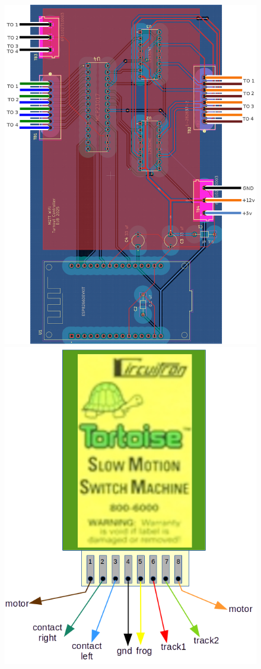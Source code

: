 \begin{figure}[H]
  \centering
    \includegraphics[scale=0.2]{board2.png}\hfill
    \includegraphics[scale=0.45]{tortoise-wiring.png}

\end{figure}

